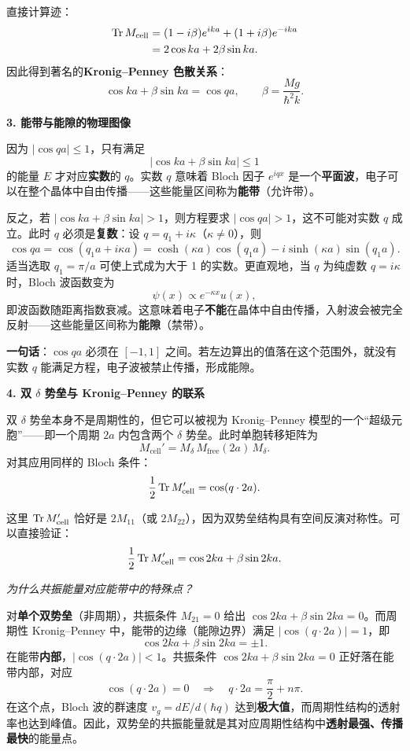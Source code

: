 直接计算迹：
\begin{align*}
\Tr M_{\text{cell}} &= (1-i\beta)e^{ika} + (1+i\beta)e^{-ika} \\
&= 2\cos ka + 2\beta\sin ka.
\end{align*}
因此得到著名的\textbf{Kronig--Penney 色散关系}：
\[
\boxed{\cos ka + \beta\sin ka = \cos qa}, \qquad \beta = \frac{Mg}{\hbar^2 k}.
\]

\textbf{3. 能带与能隙的物理图像}

因为 $|\cos qa| \le 1$，只有满足
\[
|\cos ka + \beta\sin ka| \le 1
\]
的能量 $E$ 才对应\textbf{实数}的 $q$。实数 $q$ 意味着 Bloch 因子 $e^{iqx}$ 是一个\textbf{平面波}，电子可以在整个晶体中自由传播——这些能量区间称为\textbf{能带}（允许带）。

反之，若 $|\cos ka + \beta\sin ka| > 1$，则方程要求 $|\cos qa| > 1$，这不可能对实数 $q$ 成立。此时 $q$ 必须是\textbf{复数}：设 $q = q_1 + i\kappa$（$\kappa \neq 0$），则
\[
\cos qa = \cos(q_1 a + i\kappa a) = \cosh(\kappa a)\cos(q_1 a) - i\sinh(\kappa a)\sin(q_1 a).
\]
适当选取 $q_1 = \pi/a$ 可使上式成为大于 1 的实数。更直观地，当 $q$ 为纯虚数 $q=i\kappa$ 时，Bloch 波函数变为
\[
\psi(x) \propto e^{-\kappa x} u(x),
\]
即波函数随距离指数衰减。这意味着电子\textbf{不能}在晶体中自由传播，入射波会被完全反射——这些能量区间称为\textbf{能隙}（禁带）。

\textbf{一句话}：$\cos qa$ 必须在 $[-1,1]$ 之间。若左边算出的值落在这个范围外，就没有实数 $q$ 能满足方程，电子波被禁止传播，形成能隙。

\textbf{4. 双 $\delta$ 势垒与 Kronig--Penney 的联系}

双 $\delta$ 势垒本身不是周期性的，但它可以被视为 Kronig--Penney 模型的一个``超级元胞''——即一个周期 $2a$ 内包含两个 $\delta$ 势垒。此时单胞转移矩阵为
\[
M_{\text{cell}}' = M_\delta \, M_{\text{free}}(2a) \, M_\delta.
\]
对其应用同样的 Bloch 条件：
\[
\frac{1}{2}\Tr M_{\text{cell}}' = \cos(q\cdot 2a).
\]

这里 $\Tr M_{\text{cell}}'$ 恰好是 $2M_{11}$（或 $2M_{22}$），因为双势垒结构具有空间反演对称性。可以直接验证：
\[
\frac{1}{2}\Tr M_{\text{cell}}' = \cos 2ka + \beta\sin 2ka.
\]

\textit{为什么共振能量对应能带中的特殊点？}

对\textbf{单个双势垒}（非周期），共振条件 $M_{21}=0$ 给出 $\cos 2ka + \beta\sin 2ka = 0$。而周期性 Kronig--Penney 中，能带的边缘（能隙边界）满足 $|\cos(q\cdot 2a)|=1$，即
\[
\cos 2ka + \beta\sin 2ka = \pm 1.
\]
在能带\textbf{内部}，$|\cos(q\cdot 2a)| < 1$。共振条件 $\cos 2ka + \beta\sin 2ka = 0$ 正好落在能带内部，对应
\[
\cos(q\cdot 2a) = 0 \quad\Longrightarrow\quad q\cdot 2a = \frac{\pi}{2} + n\pi.
\]
在这个点，Bloch 波的群速度 $v_g = dE/d(\hbar q)$ 达到\textbf{极大值}，而周期性结构的透射率也达到峰值。因此，双势垒的共振能量就是其对应周期性结构中\textbf{透射最强、传播最快}的能量点。

